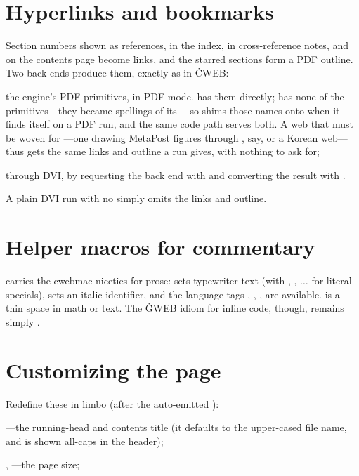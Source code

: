 \section{Hyperlinks and bookmarks}
Section numbers shown as references, in the index, in cross-reference notes, and
on the contents page become links, and the starred sections form a PDF outline.
Two back ends produce them, exactly as in \.{CWEB}:

\bull the engine's PDF primitives, in PDF mode.  has them directly;
 has none of the  primitives---they became spellings of
its ---so  shims those names onto
 when it finds itself on a  PDF run, and the same
code path serves both. A web that must be woven for ---one drawing
MetaPost figures through , say, or a Korean web---thus gets the same
links and outline a  run gives, with nothing to ask for;

\bull through DVI, by requesting the  back end with
 and converting the result with .

\noindent A plain DVI run with no  simply omits the links and outline.

\section{Helper macros for commentary}
 carries the cwebmac niceties for prose: 
sets typewriter text (with \cw{\bs\bs}, , $\ldots$ for literal
specials),  sets an italic identifier, and the
language tags , , ,  are
available. \cw{\bs,} is a thin space in math or text. The \.{GWEB} idiom for inline
code, though, remains simply .

\section{Customizing the page}
Redefine these in limbo (after the auto-emitted ):

\bull {}---the running-head and contents
title (it defaults to the upper-cased file name, and is shown all-caps in the
header);

\bull {}, ---the page size;

